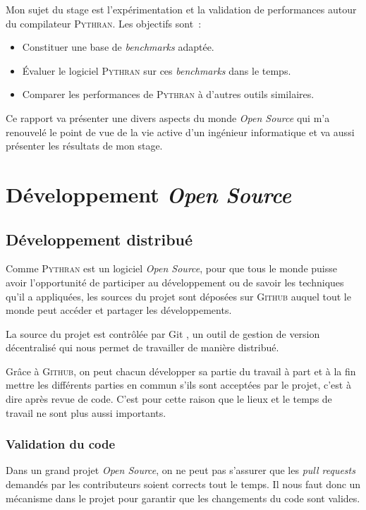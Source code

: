 \documentclass[a4paper, 11pt]{article}
\newcommand\Pythran{\textsc{Pythran}}
\newcommand\Github{\textsc{Github}}
\begin{document}
Mon sujet du stage est l'expérimentation et la validation de performances
autour du compilateur \Pythran{}. Les objectifs sont~:

  \begin{itemize}
    \item Constituer une base de \emph{benchmarks} adaptée.
    \item Évaluer le logiciel \Pythran{} sur ces \emph{benchmarks} dans le temps.
    \item Comparer les performances de \Pythran{} à d'autres outils similaires.
  \end{itemize}

	Ce rapport va présenter une divers aspects du monde \emph{Open Source}
	qui m'a renouvelé le point de vue de la vie active d'un ingénieur
	informatique et va aussi présenter les résultats de mon stage.

\section{Développement \emph{Open Source}}
\label{sec:developpement-open-source}

\subsection*{Développement distribué}

Comme \Pythran{} est un logiciel \emph{Open Source}, pour que tous le monde
puisse avoir l'opportunité de participer au développement ou de savoir les
techniques qu'il a appliquées, les sources du projet sont déposées sur
\Github{} auquel tout le monde peut accéder et partager les développements.

La source du projet est contrôlée par Git \cite{git}, un outil de gestion de version
décentralisé qui nous permet de travailler de manière distribué.


Grâce à \Github{}, on peut chacun développer sa partie du travail à part et à
la fin mettre les différents parties en commun s'ils sont acceptées par le
projet, c'est à dire après revue de code. C'est pour cette raison que le lieux et le temps de travail ne sont plus aussi
importants.

\subsubsection*{Validation du code}

Dans un grand projet \emph{Open Source}, on ne peut pas s'assurer que les \emph{pull
requests} demandés par les contributeurs soient corrects tout le temps. Il nous
faut donc un mécanisme dans le projet pour garantir que les changements du code sont
valides.
\end{document}
